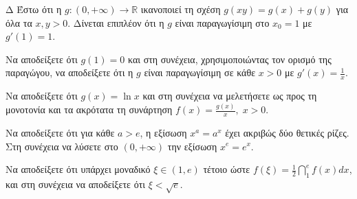 \begin{thema}{Δ}
Έστω ότι η $g: (0, +\infty) \to \mathbb{R}$ ικανοποιεί τη σχέση $g(xy) = g(x) + g(y)$ για όλα τα $x, y > 0$. Δίνεται επιπλέον ότι η $g$ είναι παραγωγίσιμη στο $x_0 = 1$ με $g'(1) = 1$.
\begin{erwthma}
    \item Να αποδείξετε ότι $g(1) = 0$ και στη συνέχεια, χρησιμοποιώντας τον ορισμό της παραγώγου, να αποδείξετε ότι η $g$ είναι παραγωγίσιμη σε κάθε $x > 0$ με $\displaystyle g'(x) = \frac{1}{x}$.
    \item Να αποδείξετε ότι $g(x) = \ln x$ και στη συνέχεια να μελετήσετε ως προς τη μονοτονία και τα ακρότατα τη συνάρτηση $\displaystyle f(x) = \frac{g(x)}{x}, \; x > 0$.
    \item Να αποδείξετε ότι για κάθε $a > e$, η εξίσωση $x^a = a^x$ έχει ακριβώς δύο θετικές ρίζες. Στη συνέχεια να λύσετε στο $(0, +\infty)$ την εξίσωση $x^e = e^x$.
    \item Να αποδείξετε ότι υπάρχει μοναδικό $\xi \in (1, e)$ τέτοιο ώστε $\displaystyle f(\xi) = \frac{1}{2} \dint_1^e f(x) dx$, και στη συνέχεια να αποδείξετε ότι $\xi < \sqrt{e}$.
\end{erwthma}
\end{thema}
